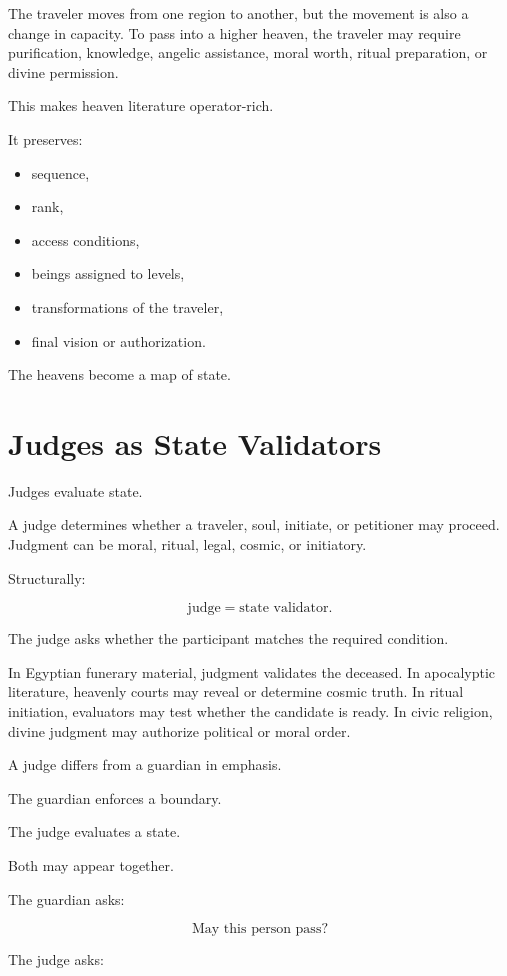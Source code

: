 \documentclass[11pt]{book}
\begin{document}
The traveler moves from one region to another, but the movement is also a change in capacity. To pass into a higher heaven, the traveler may require purification, knowledge, angelic assistance, moral worth, ritual preparation, or divine permission.

This makes heaven literature operator-rich.

It preserves:

\begin{itemize}
    \item sequence,
    \item rank,
    \item access conditions,
    \item beings assigned to levels,
    \item transformations of the traveler,
    \item final vision or authorization.
\end{itemize}

The heavens become a map of state.

\section{Judges as State Validators}

Judges evaluate state.

A judge determines whether a traveler, soul, initiate, or petitioner may proceed. Judgment can be moral, ritual, legal, cosmic, or initiatory.

Structurally:

\[
\text{judge} = \text{state validator}.
\]

The judge asks whether the participant matches the required condition.

In Egyptian funerary material, judgment validates the deceased. In apocalyptic literature, heavenly courts may reveal or determine cosmic truth. In ritual initiation, evaluators may test whether the candidate is ready. In civic religion, divine judgment may authorize political or moral order.

A judge differs from a guardian in emphasis.

The guardian enforces a boundary.

The judge evaluates a state.

Both may appear together.

The guardian asks:

\[
\text{May this person pass?}
\]

The judge asks:
\end{document}
